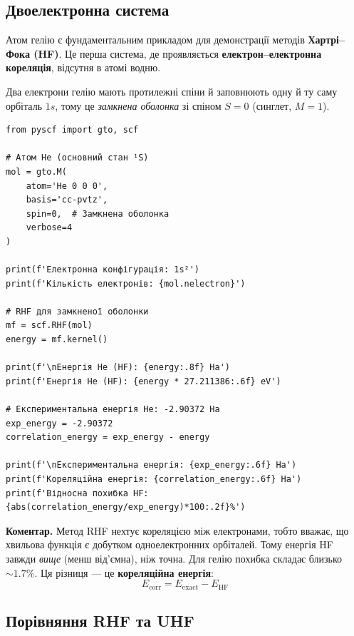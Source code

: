 \subsection{Двоелектронна система}

Атом гелію є фундаментальним прикладом для демонстрації методів \textbf{Хартрі–Фока (HF)}.
Це перша система, де проявляється \textbf{електрон–електронна кореляція}, відсутня в атомі водню.

Два електрони гелію мають протилежні спіни й заповнюють одну й ту саму орбіталь $1s$, тому це \emph{замкнена оболонка}
зі спіном $S = 0$ (синглет, $M = 1$).

\begin{verbatim}
from pyscf import gto, scf

# Атом He (основний стан ¹S)
mol = gto.M(
    atom='He 0 0 0',
    basis='cc-pvtz',
    spin=0,  # Замкнена оболонка
    verbose=4
)

print(f'Електронна конфігурація: 1s²')
print(f'Кількість електронів: {mol.nelectron}')

# RHF для замкненої оболонки
mf = scf.RHF(mol)
energy = mf.kernel()

print(f'\nЕнергія He (HF): {energy:.8f} Ha')
print(f'Енергія He (HF): {energy * 27.211386:.6f} eV')

# Експериментальна енергія He: -2.90372 Ha
exp_energy = -2.90372
correlation_energy = exp_energy - energy

print(f'\nЕкспериментальна енергія: {exp_energy:.6f} Ha')
print(f'Кореляційна енергія: {correlation_energy:.6f} Ha')
print(f'Відносна похибка HF: {abs(correlation_energy/exp_energy)*100:.2f}%')
\end{verbatim}

\textbf{Коментар.}
Метод RHF нехтує кореляцією між електронами, тобто вважає, що хвильова функція є добутком одноелектронних орбіталей.
Тому енергія HF завжди \emph{вище} (менш від’ємна), ніж точна. Для гелію похибка складає близько \(\sim 1.7\%\).
Ця різниця --- це \textbf{кореляційна енергія}:
\[
    E_{\text{corr}} = E_{\text{exact}} - E_{\text{HF}}
\]


\subsection{Порівняння RHF та UHF}

